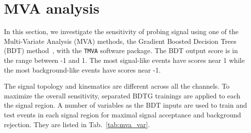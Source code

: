 \section{MVA analysis}
\label{sec:mva}

In this section, we investigate the sensitivity of probing signal using one of the Multi-Variate Analysis (MVA) methods, the Gradient Boosted Decision Trees (BDT) method~\cite{BDT,BDT2}, with the {\tt TMVA} software package. The BDT output score is in the range between -1 and 1. The most signal-like events have scores near 1 while the most background-like events have scores near -1.

The signal topology and kinematics are different across all the channels. To maximize the overall sensitivity, separated BDTG trainings are applied to each the signal region. A number of variables as the BDT inputs are used to train and test events in each signal region for maximal signal acceptance and background rejection. They are listed in Tab.~\ref{tab:mva_var}. 

